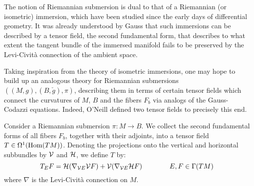 The notion of Riemannian submersion is dual to that of a Riemannian (or isometric) immersion, which have been studied since the early days of differential geometry. It was already understood by Gauss that such immersions can be described by a tensor field, the second fundamental form, that describes to what extent the tangent bundle of the immersed manifold fails to be preserved by the Levi-Civit\`a connection of the ambient space.

Taking inspiration from the theory of isometric immersions, one may hope to build up an analogous theory for Riemannian submersions $((M,g),(B,\check g),\pi)$, describing them in terms of certain tensor fields which connect the curvatures of $M$, $B$ and the fibers $F_b$ via analogs of the Gauss-Codazzi equations. Indeed, O'Neill defined two tensor fields to precisely this end.

\begin{mydef}
	Consider a Riemannian submersion $\pi:M\to B$. We collect the second fundamental forms of all fibers $F_b$, together with their adjoints, into a tensor field $T\in\Omega^1(\operatorname{Hom}(TM))$. Denoting the projections onto the vertical and horizontal subbundles by $\mathcal{V}$ and $\mathcal{H}$, we define $T$ by:
	\begin{equation*}
		T_E F=\mathcal{H}(\nabla_{\mathcal{V} E}\mathcal{V} F)+\mathcal{V}(\nabla_{\mathcal{V} E}\mathcal{H} F)\qquad \qquad E,F\in \Gamma(TM)
	\end{equation*}
	where $\nabla$ is the Levi-Civit\`a connection on $M$.
\end{mydef}

